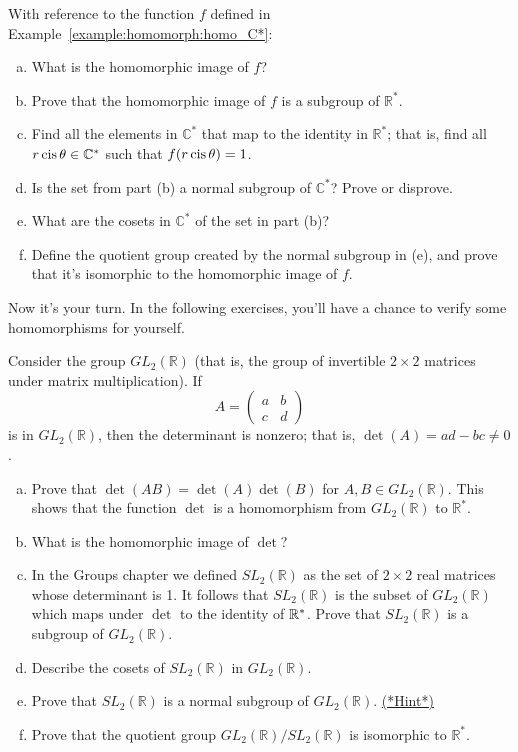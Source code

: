 \begin{exercise}\label{exercise:homomorph:Cstar_modulus_cosets}
With reference to the function $f$ defined in Example~\ref{example:homomorph:homo_C*}:
\begin{enumerate}[(a)]
\item
What is the homomorphic image of $f$?
\item
Prove that the homomorphic image of $f$ is a subgroup of ${\mathbb R}^\ast$.
\item
Find all the elements in ${\mathbb C}^\ast$ that map  to the identity in ${\mathbb R}^\ast$; that is, find all $r \operatorname{cis} \theta \in {\mathbb C}^\ast$ such that $f(r \operatorname{cis} \theta) = 1$.
\item
Is the set from part (b) a normal subgroup of ${\mathbb C}^\ast$?  Prove or disprove.
\item
What are the cosets in ${\mathbb C}^\ast$ of the set in part (b)?
\item
Define the quotient group created by the normal subgroup in (e), and prove that it's isomorphic to  the homomorphic image of $f$.
\end{enumerate}
\end{exercise}
 

Now it's your turn. In the following exercises, you'll have a chance  to verify some homomorphisms for yourself.

\begin{exercise}\label{exercise:homomorph:homo_GL2}
Consider the group $GL_2( {\mathbb R })$ (that is, the group of invertible $2 \times 2$ matrices under matrix multiplication). If
\[
A=
\begin{pmatrix}
a & b \\
c & d
\end{pmatrix}
\]
is in $GL_2( {\mathbb R })$, then the determinant is  nonzero; that is, $\det(A) = ad -bc
\neq 0$.  

\begin{enumerate}[(a)]
\item
Prove that $\det( AB) = \det(A) \det(B)$ for $A, B \in GL_2( {\mathbb R}
)$. This shows that the function $\det$ is a homomorphism from $ GL_2( {\mathbb R })$ to ${\mathbb R}^\ast$.

\item
What is the homomorphic image of $\det$?
\item
In the Groups chapter we defined $SL_2( {\mathbb R })$ as the set of $2 \times 2$ real matrices whose determinant is 1. It follows that $SL_2( {\mathbb R })$ is the subset of $GL_2( {\mathbb R })$ which maps under $\det$ to the identity of $\mathbb{R}^*$. Prove that $SL_2( {\mathbb R })$ is a subgroup of $GL_2( {\mathbb R })$.
\item
Describe the cosets of $SL_2( {\mathbb R })$ in $GL_2( {\mathbb R })$.
\item
Prove that $SL_2( {\mathbb R })$ is a normal subgroup of $GL_2( {\mathbb R })$. 
\hyperref[sec:homomorph:hints]{(*Hint*)} 
\item
Prove that the quotient group $GL_2( {\mathbb R }) / SL_2( {\mathbb R })$ is isomorphic to ${\mathbb R}^\ast$.
\end{enumerate}  
\end{exercise}

